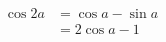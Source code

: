 \documentclass[12pt, a4paper]{article}
\begin{document}
%		
%		
%		
\begin{demo}[narrow]{}
	\begin{align}
	\cos 2a & = \cos a - \sin a \nonumber \\
		& = 2\cos a - 1
\end{align}
\end{demo}
%

%
%
%
%
%
%
%
\end{document}
